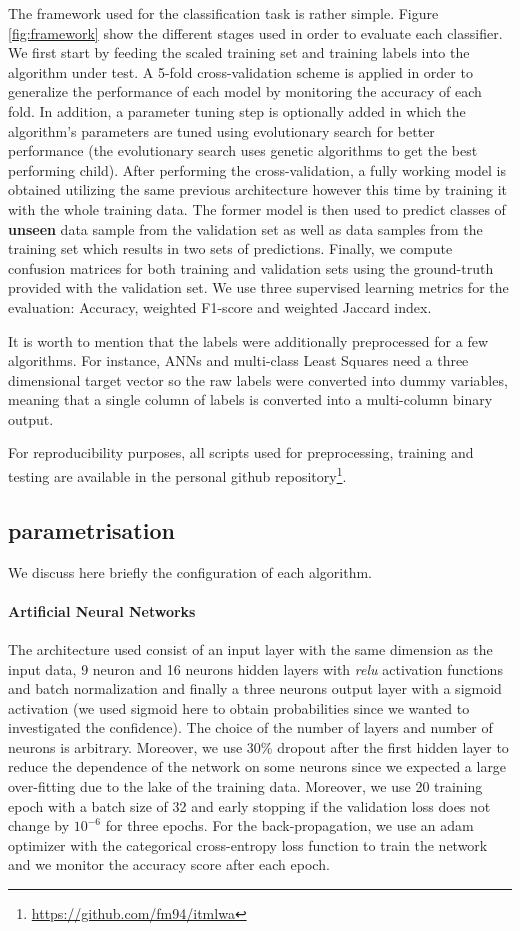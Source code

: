 \documentclass{article}
\begin{document}
The framework used for the classification task is rather simple. Figure \ref{fig:framework} show the different stages used in order to evaluate each classifier. We first start by feeding the scaled training set and training labels into the algorithm under test. A 5-fold cross-validation scheme is applied in order to generalize the performance of each model by monitoring the accuracy of each fold. In addition, a parameter tuning step is optionally added in which the algorithm's parameters are tuned using evolutionary search for better performance (the evolutionary search uses genetic algorithms to get the best performing child). After performing the cross-validation, a fully working model is obtained utilizing the same previous architecture however this time by training it with the whole training data. The former model is then used to predict classes of \textbf{unseen} data sample from the validation set as well as data samples from the training set which results in two sets of predictions. Finally, we compute confusion matrices for both training and validation sets using the ground-truth provided with the validation set. We use three supervised learning metrics for the evaluation: Accuracy, weighted F1-score and weighted Jaccard index.

It is worth to mention that the labels were additionally preprocessed for a few algorithms. For instance, ANNs and multi-class Least Squares need a three dimensional target vector so the raw labels were converted into dummy variables, meaning that a single column of labels is converted into a multi-column binary output.

For reproducibility purposes, all scripts used for preprocessing, training and testing are available in the personal github repository\footnote{\url{https://github.com/fm94/itmlwa}}.

\subsection{parametrisation}
We discuss here briefly the configuration of each algorithm.

\paragraph{Artificial Neural Networks}
The architecture used consist of an input layer with the same dimension as the input data, 9 neuron and 16 neurons hidden layers with \emph{relu} activation functions and batch normalization and finally a three neurons output layer with a sigmoid activation (we used sigmoid here to obtain probabilities since we wanted to investigated the confidence). The choice of the number of layers and number of neurons is arbitrary. Moreover, we use 30\% dropout after the first hidden layer to reduce the dependence of the network on some neurons since we expected a large over-fitting due to the lake of the training data. Moreover, we use 20 training epoch with a batch size of 32 and early stopping if the validation loss does not change by $10^{-6}$ for three epochs. For the back-propagation, we use an adam optimizer with the categorical cross-entropy loss function to train the network and we monitor the accuracy score after each epoch.
\end{document}
